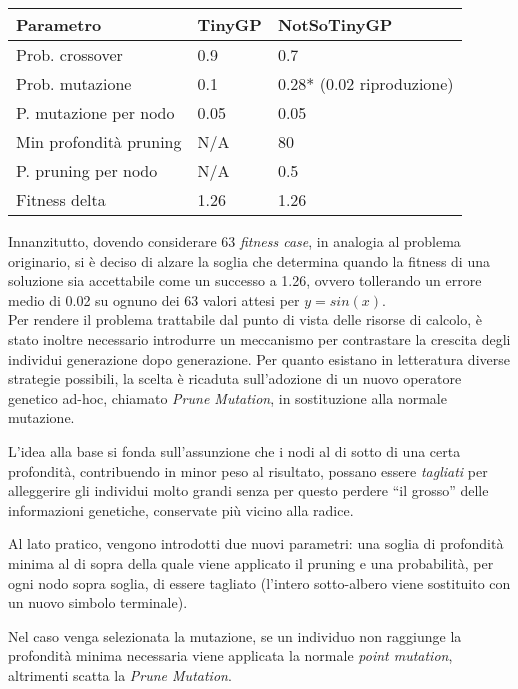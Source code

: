 \documentclass{../llncs}
\begin{document}
\begin{table}
\begin{tabular}{l | p{2.7cm} | p{4.3cm}}
\textbf{Parametro}		& \textbf{TinyGP} 	& \textbf{NotSoTinyGP} 		\\ \hline
Prob. crossover 		& 0.9				& 0.7 						\\ \hline
Prob. mutazione			& 0.1 				& 0.28* (0.02 riproduzione) \\ \hline
P. mutazione per nodo 	& 0.05 				& 0.05 						\\ \hline
Min profondità pruning 	& N/A 				& 80 						\\ \hline
P. pruning per nodo 	& N/A 				& 0.5						\\ \hline
Fitness delta 			& 1.26 				& 1.26					 	\\ %
\end{tabular}
\caption{} \label{tableSinParams}
\end{table}

Innanzitutto, dovendo considerare 63 \emph{fitness case}, in analogia al problema originario, si è deciso di alzare la soglia che determina quando la fitness di una soluzione sia accettabile come un successo a 1.26, ovvero tollerando un errore medio di 0.02 su ognuno dei 63 valori attesi per $y=sin(x)$.\\

Per rendere il problema trattabile dal punto di vista delle risorse di calcolo, è stato inoltre necessario introdurre un meccanismo per contrastare la crescita degli individui generazione dopo generazione. Per quanto esistano in letteratura diverse strategie possibili, la scelta è ricaduta sull'adozione di un nuovo operatore genetico ad-hoc, chiamato \emph{Prune Mutation}, in sostituzione alla normale mutazione.

L'idea alla base si fonda sull'assunzione che i nodi al di sotto di una certa profondità, contribuendo in minor peso al risultato, possano essere \emph{tagliati} per alleggerire gli individui molto grandi senza per questo perdere ``il grosso'' delle informazioni genetiche, conservate più vicino alla radice.

Al lato pratico, vengono introdotti due nuovi parametri: una soglia di profondità minima al di sopra della quale viene applicato il pruning e una probabilità, per ogni nodo sopra soglia, di essere tagliato (l'intero sotto-albero viene sostituito con un nuovo simbolo terminale).

Nel caso venga selezionata la mutazione, se un individuo non raggiunge la profondità minima necessaria viene applicata la normale \emph{point mutation}, altrimenti scatta la \emph{Prune Mutation}.\\
\end{document}
